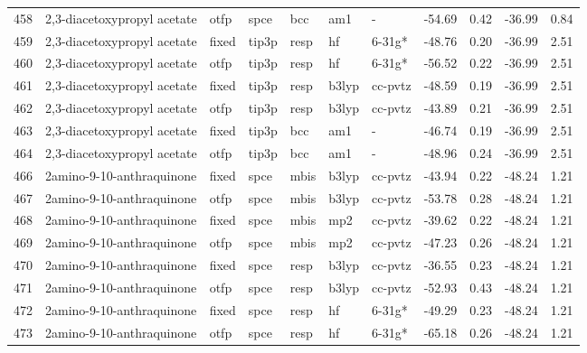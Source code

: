 \begin{tabular}{lllllllrrrr}
458 &   2,3-diacetoxypropyl acetate &   otfp &   spce &    bcc &     am1 &            - &      -54.69 &     0.42 &      -36.99 &      0.84 \\
459 &   2,3-diacetoxypropyl acetate &  fixed &  tip3p &   resp &      hf &       6-31g* &      -48.76 &     0.20 &      -36.99 &      2.51 \\
460 &   2,3-diacetoxypropyl acetate &   otfp &  tip3p &   resp &      hf &       6-31g* &      -56.52 &     0.22 &      -36.99 &      2.51 \\
461 &   2,3-diacetoxypropyl acetate &  fixed &  tip3p &   resp &   b3lyp &      cc-pvtz &      -48.59 &     0.19 &      -36.99 &      2.51 \\
462 &   2,3-diacetoxypropyl acetate &   otfp &  tip3p &   resp &   b3lyp &      cc-pvtz &      -43.89 &     0.21 &      -36.99 &      2.51 \\
463 &   2,3-diacetoxypropyl acetate &  fixed &  tip3p &    bcc &     am1 &            - &      -46.74 &     0.19 &      -36.99 &      2.51 \\
464 &   2,3-diacetoxypropyl acetate &   otfp &  tip3p &    bcc &     am1 &            - &      -48.96 &     0.24 &      -36.99 &      2.51 \\
466 &     2amino-9-10-anthraquinone &  fixed &   spce &   mbis &   b3lyp &      cc-pvtz &      -43.94 &     0.22 &      -48.24 &      1.21 \\
467 &     2amino-9-10-anthraquinone &   otfp &   spce &   mbis &   b3lyp &      cc-pvtz &      -53.78 &     0.28 &      -48.24 &      1.21 \\
468 &     2amino-9-10-anthraquinone &  fixed &   spce &   mbis &     mp2 &      cc-pvtz &      -39.62 &     0.22 &      -48.24 &      1.21 \\
469 &     2amino-9-10-anthraquinone &   otfp &   spce &   mbis &     mp2 &      cc-pvtz &      -47.23 &     0.26 &      -48.24 &      1.21 \\
470 &     2amino-9-10-anthraquinone &  fixed &   spce &   resp &   b3lyp &      cc-pvtz &      -36.55 &     0.23 &      -48.24 &      1.21 \\
471 &     2amino-9-10-anthraquinone &   otfp &   spce &   resp &   b3lyp &      cc-pvtz &      -52.93 &     0.43 &      -48.24 &      1.21 \\
472 &     2amino-9-10-anthraquinone &  fixed &   spce &   resp &      hf &       6-31g* &      -49.29 &     0.23 &      -48.24 &      1.21 \\
473 &     2amino-9-10-anthraquinone &   otfp &   spce &   resp &      hf &       6-31g* &      -65.18 &     0.26 &      -48.24 &      1.21 \\

\end{tabular}

